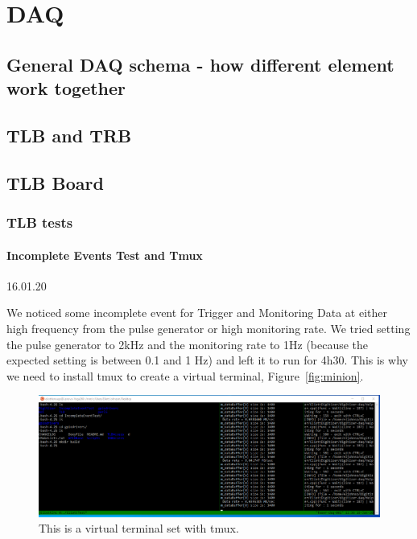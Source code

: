 
\chapter{DAQ}

\ifpdf
    \graphicspath{{ChapterDAQ/Figs/Raster/}{ChapterDAQ/Figs/PDF/}{ChapterDAQ/Figs/}}
\else
    \graphicspath{{ChapterDAQ/Figs/Vector/}{ChapterDAQ/Figs/}}
\fi

\section{General DAQ schema - how different element work together}
\section{TLB and TRB}
\section{TLB Board}
\subsection{TLB tests}
\subsubsection[Incomplete Events Test]{Incomplete Events Test and Tmux}

16.01.20

We noticed some incomplete event for Trigger and Monitoring Data at either high frequency from the pulse generator or high monitoring rate. We tried setting the pulse generator to 2kHz and the monitoring rate to 1Hz (because the expected setting is between 0.1 and 1 Hz) and left it to run for 4h30. This is why we need to install tmux to create a virtual terminal,  Figure~\ref{fig:minion}. 

\begin{figure}[htbp!] 
\centering    
\includegraphics[width=1.0\textwidth]{tmuxIncompleteEventTest}
\caption[Minion]{This is a virtual terminal set with tmux.}
\label{fig:tmux}
\end{figure}
